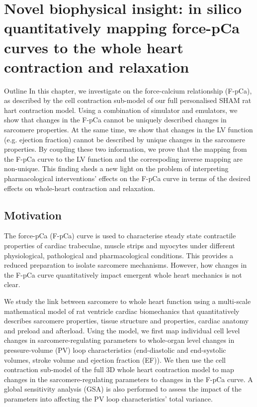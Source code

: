 \chapter{Novel biophysical insight: in silico quantitatively mapping force-pCa curves to the whole heart contraction and relaxation}\label{cha:chapter8}
%
%
%
\begin{remark}{Outline}
    In this chapter, we investigate on the force-calcium relationship (F-pCa), as described by the cell contraction sub-model of our full personalised SHAM rat hart contraction model. Using a combination of simulator and emulators, we show that changes in the F-pCa cannot be uniquely described changes in sarcomere properties. At the same time, we show that changes in the LV function (e.g. ejection fraction) cannot be described by unique changes in the sarcomere properties. By coupling these two information, we prove that the mapping from the F-pCa curve to the LV function and the correspoding inverse mapping are non-unique. This finding sheds a new light on the problem of interpreting pharmacological interventions' effects on the F-pCa curve in terms of the desired effects on whole-heart contraction and relaxation.
\end{remark}


%
%
%
\section{Motivation}\label{sec:ch8motivation}

\noindent
The force-pCa (F-pCa) curve is used to characterise steady state contractile properties of cardiac trabeculae, muscle strips and myocytes under different physiological, pathological and pharmacological conditions. This provides a reduced preparation to isolate sarcomere mechanisms. However, how changes in the F-pCa curve quantitatively impact emergent whole heart mechanics is not clear.

We study the link between sarcomere to whole heart function using a multi-scale mathematical model of rat ventricle cardiac biomechanics that quantitatively describes sarcomere properties, tissue structure and properties, cardiac anatomy and preload and afterload. Using the model, we first map individual cell level changes in sarcomere-regulating parameters to whole-organ level changes in pressure-volume (PV) loop characteristics (end-diastolic and end-systolic volumes, stroke volume and ejection fraction (EF)). We then use the cell contraction sub-model of the full $3$D whole heart contraction model to map changes in the sarcomere-regulating parameters to changes in the F-pCa curve. A global sensitivity analysis (GSA) is also performed to assess the impact of the parameters into affecting the PV loop characteristics' total variance.

